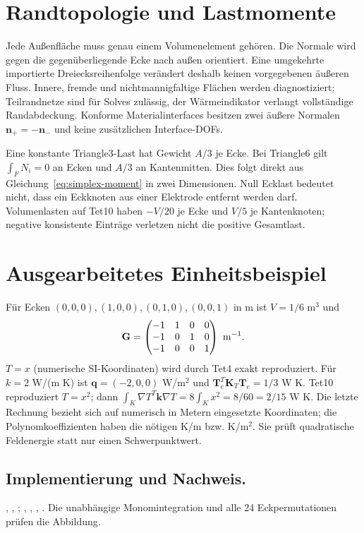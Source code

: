 \section{Randtopologie und Lastmomente}
Jede Außenfläche muss genau einem Volumenelement gehören. Die Normale wird
gegen die gegenüberliegende Ecke nach außen orientiert. Eine umgekehrte
importierte Dreiecksreihenfolge verändert deshalb keinen vorgegebenen äußeren
Fluss. Innere, fremde und nichtmannigfaltige Flächen werden diagnostiziert;
Teilrandnetze sind für Solves zulässig, der Wärmeindikator verlangt vollständige
Randabdeckung. Konforme Materialinterfaces besitzen zwei äußere Normalen
$\mathbf n_+=-\mathbf n_-$ und keine zusätzlichen Interface-DOFs.

Eine konstante Triangle3-Last hat Gewicht $A/3$ je Ecke. Bei Triangle6 gilt
$\int_F N_i=0$ an Ecken und $A/3$ an Kantenmitten. Dies folgt direkt aus
Gleichung~\ref{eq:simplex-moment} in zwei Dimensionen. Null Ecklast bedeutet
nicht, dass ein Eckknoten aus einer Elektrode entfernt werden darf.
Volumenlasten auf Tet10 haben $-V/20$ je Ecke und $V/5$ je Kantenknoten;
negative konsistente Einträge verletzen nicht die positive Gesamtlast.

\section{Ausgearbeitetes Einheitsbeispiel}\label{sec:unit-tet}
Für Ecken $(0,0,0),(1,0,0),(0,1,0),(0,0,1)$ in m ist $V=1/6$ m$^3$ und
\begin{equation}\label{eq:unit-G}
\mathbf G=\begin{pmatrix}-1&1&0&0\\-1&0&1&0\\-1&0&0&1\end{pmatrix}\ {\rm m}^{-1}.
\end{equation}
$T=x$ (numerische SI-Koordinaten) wird durch Tet4 exakt reproduziert.
Für $k=2$ W/(m K) ist $\mathbf q=(-2,0,0)$ W/m$^2$ und
$\mathbf T_e^T\mathbf K_T\mathbf T_e=1/3$ W K.
Tet10 reproduziert $T=x^2$; dann
$\int_K\nabla T^T\mathbf k\nabla T=8\int_K x^2=8/60=2/15$ W K.
Die letzte Rechnung bezieht sich auf numerisch in Metern eingesetzte
Koordinaten; die Polynomkoeffizienten haben die nötigen K/m bzw. K/m$^2$.
Sie prüft quadratische Feldenergie statt nur einen Schwerpunktwert.

\subsection*{Implementierung und Nachweis.}
{\small\raggedright
{},
,
;
,
,
,
. Die unabhängige
Monomintegration und alle 24 Eckpermutationen prüfen die Abbildung.

\par}
